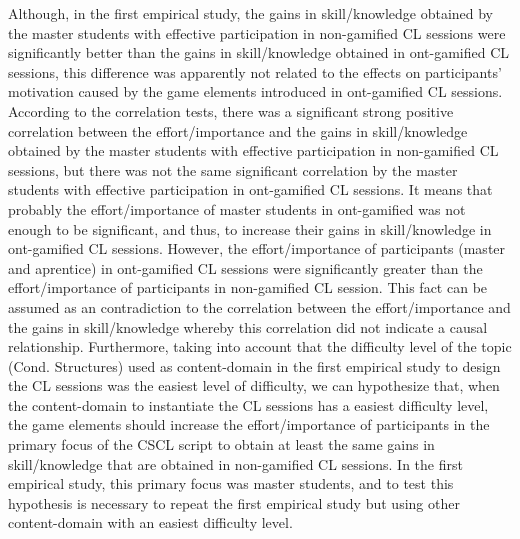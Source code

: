 Although, in the first empirical study, the gains in skill/knowledge obtained by the master students with effective participation in non-gamified CL sessions were significantly better than the gains in skill/knowledge obtained in ont-gamified CL sessions, this difference was apparently not related to the effects on participants' motivation caused by the game elements introduced in ont-gamified CL sessions. According to the correlation tests, there was a significant strong positive correlation between the effort/importance and the gains in skill/knowledge obtained by the master students with effective participation in non-gamified CL sessions, but there was not the same significant correlation by the master students with effective participation in ont-gamified CL sessions. It means that probably the effort/importance of master students in ont-gamified was not enough to be significant, and thus, to increase their gains in skill/knowledge in ont-gamified CL sessions. However, the effort/importance of participants (master and aprentice) in ont-gamified CL sessions were significantly greater than the effort/importance of participants in non-gamified CL session. This fact can be assumed as an contradiction to the correlation between the effort/importance and the gains in skill/knowledge whereby this correlation did not indicate a causal relationship. Furthermore, taking into account that the difficulty level of the topic (Cond. Structures) used as content-domain in the first empirical study to design the CL sessions was the easiest level of difficulty, we can hypothesize that, when the content-domain to instantiate the CL sessions has a easiest difficulty level, the game elements should increase the effort/importance of participants in the primary focus of the CSCL script to obtain at least the same gains in skill/knowledge that are obtained in non-gamified CL sessions. In the first empirical study, this primary focus was master students, and to test this hypothesis is necessary to repeat the first empirical study but using other content-domain with an easiest difficulty level.

